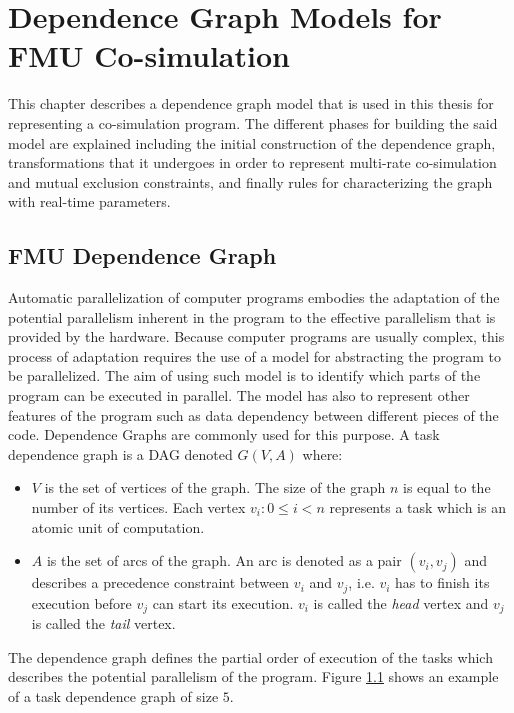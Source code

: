 \chapter{\label{ch:4-accel}Dependence Graph Models for FMU Co-simulation} 

\minitoc

This chapter describes a dependence graph model that is used in this thesis for representing a co-simulation program. The different phases for building the said model are explained including the initial construction of the dependence graph, transformations that it undergoes in order to represent multi-rate co-simulation and mutual exclusion constraints, and finally rules for characterizing the graph with real-time parameters.
 
\section{\label{sec:4-depgrph}FMU Dependence Graph}

Automatic parallelization of computer programs embodies the adaptation of the potential parallelism inherent in the program to the effective parallelism that is provided by the hardware. Because computer programs are usually complex, this process of adaptation requires the use of a model for abstracting the program to be parallelized. The aim of using such model is to identify which parts of the program can be executed in parallel. The model has also to represent other features of the program such as data dependency between different pieces of the code. Dependence Graphs are commonly used for this purpose. A task dependence graph is a DAG denoted $G(V,A)$ where:
\begin{itemize}
\item $V$ is the set of vertices of the graph. The size of the graph $n$ is equal to the number of its vertices. Each vertex $v_i: 0 \leq i < n$ represents a task which is an atomic unit of computation.
\item $A$ is the set of arcs of the graph. An arc is denoted as a pair $(v_i,v_j)$ and describes a precedence constraint between $v_i$ and $v_j$, i.e. $v_i$ has to finish its execution before $v_j$ can start its execution. $v_i$ is called the \textit{head} vertex and $v_j$ is called the \textit{tail} vertex. 
\end{itemize}

The dependence graph defines the partial order of execution of the tasks which describes the potential parallelism of the program. Figure \ref{} shows an example of a task dependence graph of size $5$.

